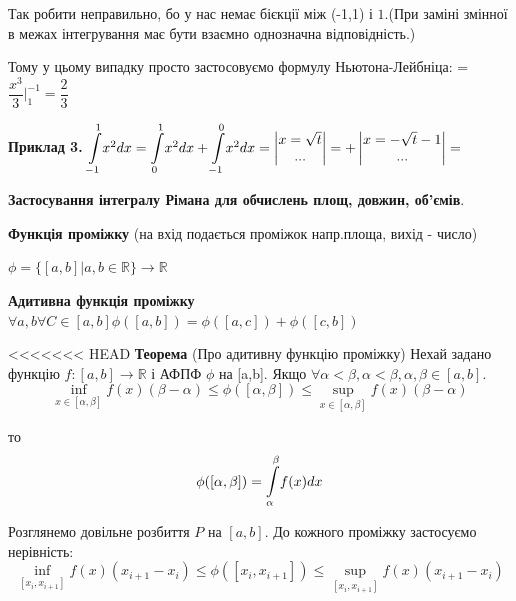 \documentclass[12pt]{report}
\begin{document}
 \vspace{3mm}
Так робити неправильно, бо у нас немає бієкції між (-1,1) і $ {1}$.(При заміні змінної в межах інтегрування має бути взаємно однозначна відповідність.) 

Тому у цьому випадку просто застосовуємо формулу Ньютона-Лейбніца:
= $ \dfrac{x^3}{3} \bigg| ^{-1}_{1} = \dfrac{2}{3}$

 \vspace{3mm}
  \textbf{Приклад 3.} $ \mathlarger\int\limits_{-1}^{1} x^2 dx  = \mathlarger\int\limits_{0}^{1} x ^2 dx+ \mathlarger\int\limits_{-1}^{0}x^2 dx =
    \begin{vmatrix}
  x = \sqrt t \\
  ...
  \end{vmatrix} = +
    \begin{vmatrix}
  x = -\sqrt{t} - 1 \\
  ...
  \end{vmatrix} =   $

 \vspace{5mm}
 	\begin{center}
 	\textbf{\Large Застосування інтегралу Рімана для обчислень площ, довжин, об'ємів}.
 \end{center}
 
\textbf{Функція проміжку} (на вхід подається проміжок напр.площа, вихід - число)

$ \phi = \{ [a,b]|  a,b \in \mathbb {R}\} \rightarrow  \mathbb {R}$

 \vspace{5mm}
\textbf{Адитивна функція проміжку}  $ {\forall a,b \forall C \in [a,b] \phi ([a,b]) = \phi ([a,c])+\phi([c,b])} $

<<<<<<< HEAD
 \vspace{5mm}
 \textbf{Теорема} (Про адитивну функцію проміжку) Нехай задано функцію $ f : [a,b] \rightarrow \mathbb {R}$ і АФПФ $\phi$ на [a,b]. Якщо $ \forall \alpha < \beta, \alpha < \beta, \alpha, \beta \in [a,b].$
 \[\inf\limits_{x \in [\alpha, \beta ]} f(x) (\beta - \alpha) \leq  	\phi ([\alpha, \beta]) \leq \sup\limits_{x \in [\alpha, \beta ]} f(x) (\beta - \alpha)\]
 
 то \[ 	\phi ([\alpha, \beta]) = \mathlarger\int\limits_\alpha^\beta f(x)dx\]
 

 Розглянемо довільне розбиття $P$ на $[a,b].$ До кожного проміжку застосуємо нерівність: 
\[\inf\limits_{[x_i, x_{i+1}]} f(x)(x_{i+1}-x_i) \leq  	\phi ([x_i, x_{i+1}]) \leq \sup\limits_{[x_i, x_{i+1} ]} f(x)(x_{i+1}-x_i)   \]
\end{document}
